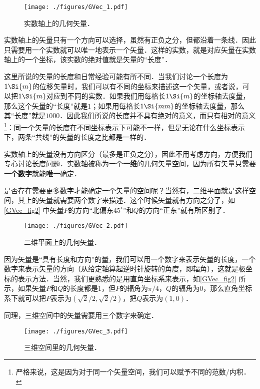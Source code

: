 \begin{figure}[ht]
\centering
\texttt{[image: ./figures/GVec\_1.pdf]}
\caption{实数轴上的几何矢量．} \label{GVec_fig1}
\end{figure}

实数轴上的矢量只有一个方向可以选择，虽然有正负之分，但都沿着一条线．因此只需要用一个实数就可以唯一地表示一个矢量．这样的实数，就是对应矢量在实数轴上的一个坐标，该实数的绝对值就是矢量的“长度”．


这里所说的矢量的长度和日常经验可能有所不同．当我们讨论一个长度为$1\Si{m}$的位移矢量时，我们可以有不同的坐标来描述这一个矢量，或者说，可以把$1\Si{m}$对应到不同的实数．如果我们用每格长$1\Si{m}$的坐标轴去度量，那么这个矢量的“长度”就是$1$；如果用每格长$1\Si{mm}$的坐标轴去度量，那么其“长度”就是$1000$．因此我们所说的长度并不具有绝对的意义，而只有相对的意义\footnote{严格来说，这是因为对于同一个矢量空间，我们可以赋予不同的范数/内积．}：同一个矢量的长度在不同坐标表示下可能不一样，但是无论在什么坐标表示下，两条“共线”的矢量的长度之比都是一样的．


实数轴上的矢量没有方向区分（最多是正负之分），因此不用考虑方向，方便我们专心讨论长度问题．实数轴被称为一个\textbf{一维}的几何矢量空间，因为所有矢量只需要\textbf{一个数字}就能\textbf{唯一}确定．

是否存在需要更多数字才能确定一个矢量的空间呢？当然有，二维平面就是这样空间，其上的矢量就需要两个数字来描述．这个时候矢量就有方向之分了，如\autoref{GVec_fig2} 中矢量$P$的方向“北偏东$45^\circ$”和$Q$的方向“正东”就有所区别了．

\begin{figure}[ht]
\centering
\texttt{[image: ./figures/GVec\_2.pdf]}
\caption{二维平面上的几何矢量．} \label{GVec_fig2}
\end{figure}

因为矢量是“具有长度和方向”的量，我们可以用一个数字来表示矢量的长度，一个数字来表示矢量的方向（从给定轴算起逆时针旋转的角度，即辐角），这就是极坐标的表示方法．当然，我们更熟悉的是用直角坐标系来表示，如\autoref{GVec_fig2} 所示，如果矢量$P$和$Q$的长度都是$1$，但$P$的辐角为$\pi/4$，$Q$的辐角为$0$，那么直角坐标系下就可以把$P$表示为$(\sqrt{2}/2, \sqrt{2}/2)$，把$Q$表示为$(1, 0)$．

同理，三维空间中的矢量需要用三个数字来确定．

\begin{figure}[ht]
\centering
\texttt{[image: ./figures/GVec\_3.pdf]}
\caption{三维空间里的几何矢量．} \label{GVec_fig3}
\end{figure}

